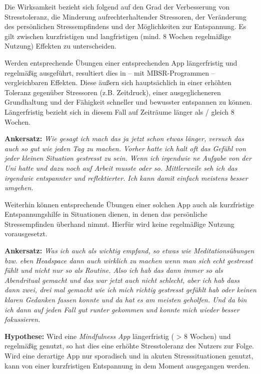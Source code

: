 \documentclass[10pt]{article}
\begin{document}
Die Wirksamkeit bezieht sich folgend auf den Grad der Verbesserung von Stresstoleranz, die Minderung aufrechterhaltender Stressoren, der Veränderung des persönlichen Stressempfindens und der Möglichkeiten zur Entspannung. Es gilt zwischen kurzfristigen und langfristigen (mind. 8 Wochen regelmäßige Nutzung) Effekten zu unterscheiden.

Werden entsprechende Übungen einer entsprechenden App längerfristig und regelmäßig ausgeführt, resultiert dies in – mit MBSR-Programmen –vergleichbaren Effekten. Diese äußern sich hauptsächlich in einer erhöhten Toleranz gegenüber Stressoren (z.B. Zeitdruck), einer ausgeglicheneren Grundhaltung und der Fähigkeit schneller und bewusster  entspannen zu können. Längerfristig bezieht sich in diesem Fall auf Zeiträume länger als / gleich 8 Wochen.

\medskip

\textbf{Ankersatz:}
\newline
\grqq\textit{Wie gesagt ich mach das ja jetzt schon etwas länger, versuch das auch so gut wie jeden Tag zu machen. Vorher hatte ich halt oft das Gefühl von jeder kleinen Situation gestresst zu sein. Wenn ich irgendwie ne Aufgabe von der Uni hatte und dazu noch auf Arbeit musste oder so. Mittlerweile seh ich das irgendwie entspannter und reflektierter. Ich kann damit einfach meistens besser umgehen.}\grqq\

\medskip

Weiterhin können entsprechende Übungen einer solchen App auch als kurzfristige Entspannungshilfe in Situationen dienen, in denen das persönliche Stressempfinden überhand nimmt. Hierfür wird keine regelmäßige Nutzung vorausgesetzt. 

\medskip

\textbf{Ankersatz:}
\newline
\grqq\textit{Was ich auch als wichtig empfand, so etwas wie Meditationsübungen bzw. eben Headspace dann auch wirklich zu machen wenn man sich echt gestresst fühlt und nicht nur so als Routine. Also ich hab das dann immer so als Abendritual gemacht und das war jetzt auch nicht schlecht, aber ich hab dass dann zwei, drei mal gemacht wie ich mich richtig gestresst gefühlt hab oder keinen klaren Gedanken fassen konnte und da hat es am meisten geholfen. Und da bin ich dann auf jeden Fall gut runter gekommen und konnte mich wieder besser fokussieren. }\grqq\

\medskip

\textbf{Hypothese: }
\newline
Wird eine \textit{Mindfulness App} längerfristig ( > 8 Wochen)  und regelmäßig genutzt, so hat dies eine erhöhte Stresstoleranz des Nutzers zur Folge. Wird eine derartige App nur sporadisch und in akuten Stresssituationen genutzt, kann von einer kurzfristigen Entspannung in dem Moment ausgegangen werden.
\end{document}
